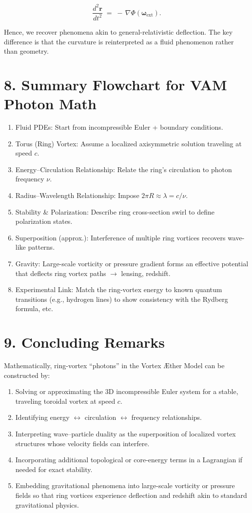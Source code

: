 \[
 \frac{d^2 \mathbf{r}}{dt^2} \;=\; -\,\nabla \Phi(\boldsymbol{\omega}_{\mathrm{ext}}).
\]

Hence, we recover phenomena akin to general-relativistic deflection. The key difference is that the curvature is reinterpreted as a fluid phenomenon rather than geometry.

\section*{8. Summary Flowchart for VAM Photon Math}
\begin{enumerate}
 \item Fluid PDEs: Start from incompressible Euler + boundary conditions.
 \item Torus (Ring) Vortex: Assume a localized axisymmetric solution traveling at speed \(c\).
 \item Energy–Circulation Relationship: Relate the ring’s circulation to photon frequency \(\nu\).
 \item Radius–Wavelength Relationship: Impose \(2\pi R \approx \lambda = c/\nu\).
 \item Stability \& Polarization: Describe ring cross-section swirl to define polarization states.
 \item Superposition (approx.): Interference of multiple ring vortices recovers wave-like patterns.
 \item Gravity: Large-scale vorticity or pressure gradient forms an effective potential that deflects ring vortex paths \(\rightarrow\) lensing, redshift.
 \item Experimental Link: Match the ring-vortex energy to known quantum transitions (e.g., hydrogen lines) to show consistency with the Rydberg formula, etc.
\end{enumerate}

\section*{9. Concluding Remarks}
Mathematically, ring-vortex “photons” in the Vortex Æther Model can be constructed by:

\begin{enumerate}
 \item Solving or approximating the 3D incompressible Euler system for a stable, traveling toroidal vortex at speed \(c\).
 \item Identifying energy \(\leftrightarrow\) circulation \(\leftrightarrow\) frequency relationships.
 \item Interpreting wave–particle duality as the superposition of localized vortex structures whose velocity fields can interfere.
 \item Incorporating additional topological or core-energy terms in a Lagrangian if needed for exact stability.
 \item Embedding gravitational phenomena into large-scale vorticity or pressure fields so that ring vortices experience deflection and redshift akin to standard gravitational physics.
\end{enumerate}

